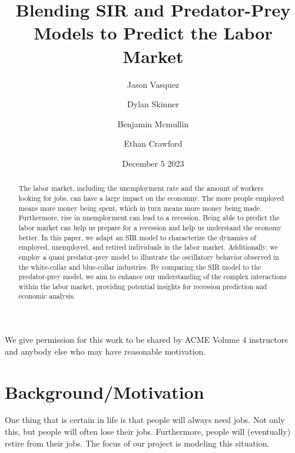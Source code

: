 \documentclass[11pt]{amsart}
\title{Blending SIR and Predator-Prey Models to Predict the Labor Market}
\author{Jason Vasquez \and Dylan Skinner \and Benjamin Mcmullin \and Ethan Crawford}
\date{December 5 2023}
\begin{document}
\begin{abstract}
    
    The labor market, including the unemployment rate and the amount of workers looking for jobs, can have a large impact on the economny.
    The more people employed means more money being spent, which in turn means more money being made. 
    Furthermore, rise in unemployment can lead to a recession. Being able to predict the labor market can help us prepare for a recession and help us understand the economy better.
    In this paper, we adapt an SIR model to characterize the dynamics of employed, unemployed, and retired individuals in the labor market. 
    Additionally, we employ a quasi predator-prey model to illustrate the oscillatory behavior observed in the white-collar and blue-collar industries. 
    By comparing the SIR model to the predator-prey model, we aim to enhance our understanding of the complex interactions within the labor market, 
    providing potential insights for recession prediction and economic analysis.
    
\end{abstract}

\maketitle

We give permission for this work to be shared by ACME Volume 4 instructors and anybody else who may have reasonable motivation.

\section{Background/Motivation}

One thing that is certain in life is that people will always need jobs. Not only this, but people 
will often lose their jobs. Furthermore, people will (eventually) retire from their jobs.
The focus of our project is modeling this situation.
\end{document}
